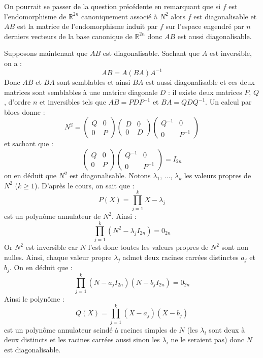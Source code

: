 \documentclass[a4paper,10pt]{report}
\begin{document}
\begin{enumerate}
\noindent On pourrait se passer de la question précédente en remarquant que si $f$ est l'endomorphisme de $\mathbb{R}^{2n}$ canoniquement associé à $N^2$ alors $f$ est diagonalisable et $AB$ est la matrice de l'endomorphisme induit par $f$ sur l'espace engendré par $n$ derniers vecteurs de la base canonique de $\mathbb{R}^{2n}$ donc $AB$ est aussi diagonalisable.

\medskip

\noindent Supposons maintenant que $AB$ est diagonalisable. Sachant que $A$ est inversible, on a :
$$ AB=A(BA)A^{-1}$$
Donc $AB$ et $BA$ sont semblables et ainsi $BA$ est aussi diagonalisable et ces deux matrices sont semblables à une matrice diagonale $D$ : il existe deux matrices $P$, $Q$, d'ordre $n$ et inversibles tels que $AB=PDP^{-1}$ et $BA= QDQ^{-1}$. Un calcul par blocs donne :
$$ N^2 = \begin{pmatrix}
Q & 0 \\
0 & P
\end{pmatrix} \begin{pmatrix}
D & 0 \\
0 & D
\end{pmatrix} \begin{pmatrix}
Q^{-1} & 0 \\
0 & P^{-1}
\end{pmatrix}$$
et sachant que :
$$ \begin{pmatrix}
Q & 0 \\
0 & P
\end{pmatrix} \begin{pmatrix}
Q^{-1} & 0 \\
0 & P^{-1}
\end{pmatrix} = I_{2n}$$
on en déduit que $N^2$ est diagonalisable. Notons $\lambda_1$, $\ldots$, $\lambda_k$ les valeurs propres de $N^2$ ($k \geq 1$). D'après le cours, on sait que :
$$ P(X) = \prod_{j=1}^k X- \lambda_j$$
est un polynôme annulateur de $N^2$. Ainsi :
$$ \prod_{j=1} ^k (N^2- \lambda_j I_{2n}) = 0_{2n}$$
Or $N^2$ est inversible car $N$ l'est donc toutes les valeurs propres de $N^2$ sont non nulles. Ainsi, chaque valeur propre $\lambda_j$ admet deux racines carrées distinctes $a_j$ et $b_j$. On en déduit que :
$$ \prod_{j=1} ^k (N- a_j I_{2n})(N - b_j I_{2n}) = 0_{2n}$$
Ainsi le polynôme :
$$ Q(X) = \prod_{j=1}^k (X-a_j)(X- b_j)$$
est un polynôme annulateur scindé à racines simples de $N$ (les $\lambda_i$ sont deux à deux distincts et les racines carrées aussi sinon les $\lambda_i$ ne le seraient pas) donc $N$ est diagonalisable.
\end{enumerate}
\end{document}
